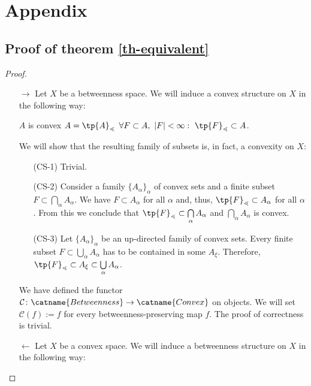 \documentclass[12pt, a4paper]{article}
\newcommand{\btw}{\lessdot}
\begin{document}
\section{Appendix}

\subsection{Proof of theorem \ref{th-equivalent}} \label{ap-th-equivalent}

\begin{proof}~
\begin{itemize}
    \item[$\longrightarrow$] Let \(X\) be a betweenness space. We will induce a convex structure on \(X\) in the following way:
    
    \begin{center}
        \(A\) is convex \Equ \(A = \tp{A}_\btw\) \Equ \(\forall F \subset A, \ |F| < \infty : \ \tp{F}_\btw \subset A\).
    \end{center}

    We will show that the resulting family of subsets is, in fact, a convexity on \(X\):

    \begin{itemize}
        \item[(CS-1)] Trivial.
        \item[(CS-2)] Consider a family \(\{A_\alpha\}_\alpha\) of convex sets and a finite subset \(F \subset \bigcap\limits_\alpha A_\alpha\). We have \(F \subset A_\alpha\) for all \(\alpha\) and, thus, \(\tp{F}_\btw \subset A_\alpha\) for all \(\alpha\). From this we conclude that \(\tp{F}_\btw \subset \bigcap\limits_\alpha A_\alpha\) and \(\bigcap\limits_\alpha A_\alpha\) is convex.
        \item[(CS-3)] Let \(\{A_\alpha\}_\alpha\) be an up-directed family of convex sets. Every finite subset \(F \subset \bigcup\limits_\alpha A_\alpha\) has to be contained in some \(A_\xi\). Therefore, \(\tp{F}_\btw \subset A_\xi \subset \bigcup\limits_\alpha A_\alpha\).
    \end{itemize}

    We have defined the functor \(\mathcal{C} \colon \catname{Betweenness} \to \catname{Convex}\) on objects. We will set \(\mathcal{C}(f) := f\) for every betweenness-preserving map \(f\). The proof of correctness is trivial.\\

    \item[$\longleftarrow$] Let \(X\) be a convex space. We will induce a betweenness structure on \(X\) in the following way:


\end{itemize}
\end{proof}
\end{document}
